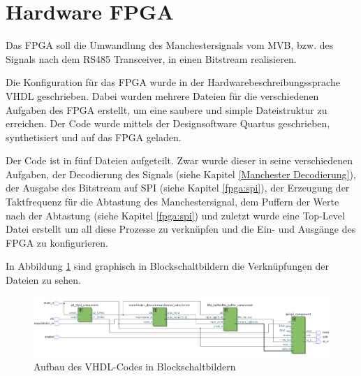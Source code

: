 


\section{Hardware FPGA}
\label{sec:HardwareFPGA}
Das FPGA soll die Umwandlung des Manchestersignals vom MVB, bzw. des Signals
nach dem RS485 Transceiver, in einen Bitstream realisieren. 

Die Konfiguration für das FPGA wurde in der Hardwarebeschreibungssprache VHDL geschrieben. Dabei wurden
mehrere Dateien für die verschiedenen Aufgaben des FPGA erstellt, um eine saubere und simple 
Dateistruktur zu erreichen. Der Code wurde mittels der Designsoftware Quartus geschrieben,
synthetisiert und auf das FPGA geladen.

Der Code ist in fünf Dateien aufgeteilt. Zwar wurde dieser in seine verschiedenen Aufgaben, der
Decodierung des Signals (siehe Kapitel \ref{Manchester Decodierung}), der Ausgabe des Bitstream auf SPI
(siehe Kapitel \ref{fpga:spi}), der Erzeugung der Taktfrequenz für die Abtastung des Manchestersignal,
dem Puffern der Werte nach der Abtastung (siehe Kapitel \ref{fpga:spi}) und zuletzt wurde eine Top-Level Datei erstellt um all diese
Prozesse zu verknüpfen und die Ein- und Ausgänge des FPGA zu konfigurieren.

In Abbildung \ref{fig:AufbauFPGA} sind graphisch in Blockschaltbildern die Verknüpfungen der Dateien zu sehen.

\begin{figure}[H]
    \centering
    \includegraphics[width=1\linewidth]{Figures/Chap3/FPGA/FPGA_Darstellung_Projekt.png}
    \caption{Aufbau des VHDL-Codes in Blockschaltbildern}
    \label{fig:AufbauFPGA}
\end{figure}

